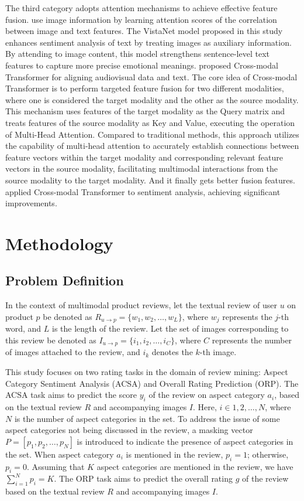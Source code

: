 \documentclass[preprint,12pt]{elsarticle}
\begin{document}
The third category adopts attention mechanisms to achieve effective feature fusion. \citet{truong2019vistanet} use image information by learning attention scores of the correlation between image and text features. The VistaNet model proposed in this study enhances sentiment analysis of text by treating images as auxiliary information. By attending to image content, this model strengthens sentence-level text features to capture more precise emotional meanings. \citet{tsai2019multimodal} proposed Cross-modal Transformer for aligning audiovisual data and text. The core idea of Cross-modal Transformer is to perform targeted feature fusion for two different modalities, where one is considered the target modality and the other as the source modality. This mechanism uses features of the target modality as the Query matrix and treats features of the source modality as Key and Value, executing the operation of Multi-Head Attention. Compared to traditional methods, this approach utilizes the capability of multi-head attention to accurately establish connections between feature vectors within the target modality and corresponding relevant feature vectors in the source modality, facilitating multimodal interactions from the source modality to the target modality. And it finally gets better fusion features. \citet{yu2022targeted} applied Cross-modal Transformer to sentiment analysis, achieving significant improvements.



\section{Methodology}

\subsection{Problem Definition}

In the context of multimodal product reviews, let the textual review of user $u$ on product $p$ be denoted as $R_{u \rightarrow p}=\{w_1,w_2,\dots,w_L\}$, where $w_j$ represents the $j$-th word, and $L$ is the length of the review. Let the set of images corresponding to this review be denoted as $I_{u\rightarrow p}=\{i_1,i_2,\ldots,i_C\}$, where $C$ represents the number of images attached to the review, and $i_k$ denotes the $k$-th image.

This study focuses on two rating tasks in the domain of review mining: Aspect Category Sentiment Analysis (ACSA) and Overall Rating Prediction (ORP). The ACSA task aims to predict the score $y_i$ of the review on aspect category $a_i$, based on the textual review $R$ and accompanying images $I$. Here, $i \in {1,2,\ldots,N}$, where $N$ is the number of aspect categories in the set. To address the issue of some aspect categories not being discussed in the review, a masking vector $P=[p_1,p_2,\ldots,p_N]$ is introduced to indicate the presence of aspect categories in the set. When aspect category $a_i$ is mentioned in the review, $p_i=1$; otherwise, $p_i=0$. Assuming that $K$ aspect categories are mentioned in the review, we have $\sum_{i=1}^N p_i = K$. The ORP task aims to predict the overall rating $g$ of the review based on the textual review $R$ and accompanying images $I$. 
\end{document}
